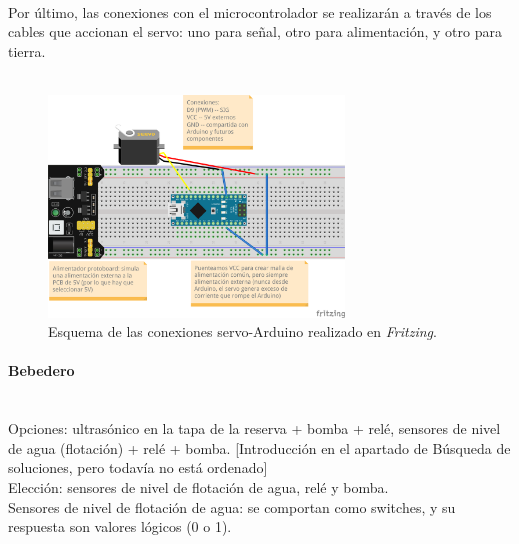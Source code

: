 \documentclass[12pt]{article}
\newcommand{\subsubsubsection}[1]{\paragraph{#1}\mbox{}\\}
\begin{document}
	 \\
	
	\noindent Por último, las conexiones con el microcontrolador se realizarán a través de los cables que accionan el servo: uno para señal, otro para alimentación, y otro para tierra. \\
	
	\pagebreak
	\\
	
	\begin{figure}[h]
		\begin{center}
			\includegraphics[width=0.7\textwidth]{img/servo_connections_v2_fritzing.png}
			\caption{Esquema de las conexiones servo-Arduino realizado en \textit{Fritzing}.}
			\label{Esquema conexiones servo Fritzing}
		\end{center}
	\end{figure}
	
	\pagebreak
	
	\subsubsubsection{Bebedero}
	
	\noindent Opciones: ultrasónico en la tapa de la reserva + bomba + relé, sensores de nivel de agua (flotación) + relé + bomba. [Introducción en el apartado de Búsqueda de soluciones, pero todavía no está ordenado]\\
	
	\noindent Elección: sensores de nivel de flotación de agua, relé y bomba. \\
	
	\noindent Sensores de nivel de flotación de agua: se comportan como switches, y su respuesta son valores lógicos (0 o 1). \\
	
\end{document}
